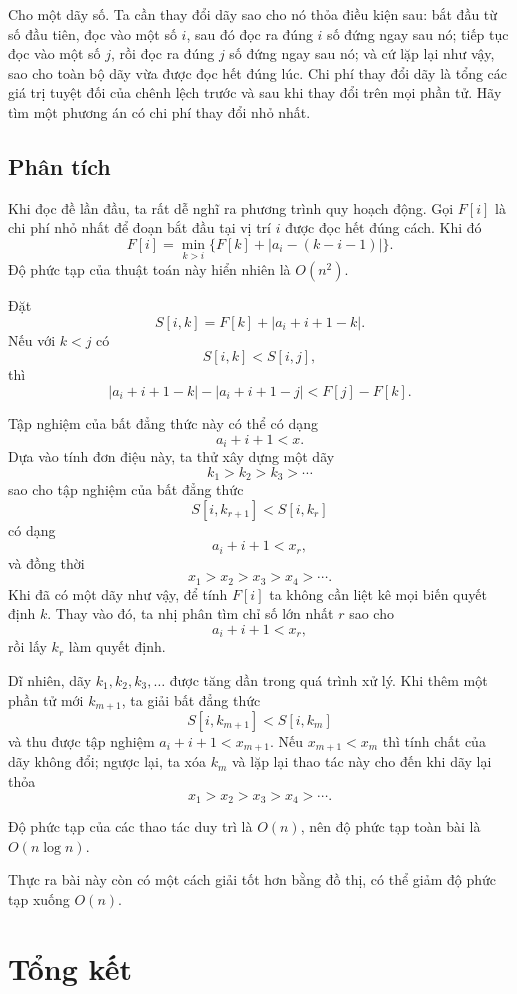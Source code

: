 \documentclass[11pt]{article}
\begin{document}
Cho một dãy số. Ta cần thay đổi dãy sao cho nó thỏa điều kiện sau: bắt đầu từ
số đầu tiên, đọc vào một số $i$, sau đó đọc ra đúng $i$ số đứng ngay sau nó;
tiếp tục đọc vào một số $j$, rồi đọc ra đúng $j$ số đứng ngay sau nó; và cứ
lặp lại như vậy, sao cho toàn bộ dãy vừa được đọc hết đúng lúc. Chi phí thay
đổi dãy là tổng các giá trị tuyệt đối của chênh lệch trước và sau khi thay
đổi trên mọi phần tử. Hãy tìm một phương án có chi phí thay đổi nhỏ nhất.

\subsection*{Phân tích}

Khi đọc đề lần đầu, ta rất dễ nghĩ ra phương trình quy hoạch động. Gọi $F[i]$
là chi phí nhỏ nhất để đoạn bắt đầu tại vị trí $i$ được đọc hết đúng cách.
Khi đó
\[
  F[i]=\min_{k>i}\{F[k]+|a_i-(k-i-1)|\}.
\]
Độ phức tạp của thuật toán này hiển nhiên là $O(n^2)$.

Đặt
\[
  S[i,k]=F[k]+|a_i+i+1-k|.
\]
Nếu với $k<j$ có
\[
  S[i,k]<S[i,j],
\]
thì
\[
  |a_i+i+1-k|-|a_i+i+1-j|<F[j]-F[k].
\]

Tập nghiệm của bất đẳng thức này có thể có dạng
\[
  a_i+i+1<x.
\]
Dựa vào tính đơn điệu này, ta thử xây dựng một dãy
\[
  k_1>k_2>k_3>\cdots
\]
sao cho tập nghiệm của bất đẳng thức
\[
  S[i,k_{r+1}]<S[i,k_r]
\]
có dạng
\[
  a_i+i+1<x_r,
\]
và đồng thời
\[
  x_1>x_2>x_3>x_4>\cdots.
\]
Khi đã có một dãy như vậy, để tính $F[i]$ ta không cần liệt kê mọi biến quyết
định $k$. Thay vào đó, ta nhị phân tìm chỉ số lớn nhất $r$ sao cho
\[
  a_i+i+1<x_r,
\]
rồi lấy $k_r$ làm quyết định.

Dĩ nhiên, dãy $k_1,k_2,k_3,\ldots$ được tăng dần trong quá trình xử lý. Khi
thêm một phần tử mới $k_{m+1}$, ta giải bất đẳng thức
\[
  S[i,k_{m+1}]<S[i,k_m]
\]
và thu được tập nghiệm $a_i+i+1<x_{m+1}$. Nếu $x_{m+1}<x_m$ thì tính chất của
dãy không đổi; ngược lại, ta xóa $k_m$ và lặp lại thao tác này cho đến khi
dãy lại thỏa
\[
  x_1>x_2>x_3>x_4>\cdots.
\]

Độ phức tạp của các thao tác duy trì là $O(n)$, nên độ phức tạp toàn bài là
$O(n\log n)$.

Thực ra bài này còn có một cách giải tốt hơn bằng đồ thị, có thể giảm độ
phức tạp xuống $O(n)$.

\section{Tổng kết}
\end{document}
